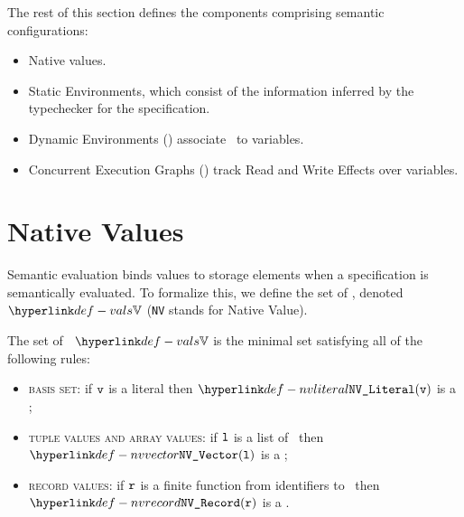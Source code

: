 The rest of this section defines the components comprising semantic configurations:
\begin{itemize}
    \item Native values.
    \item Static Environments, which consist of the information inferred
            by the typechecker for the specification.
    \item Dynamic Environments () associate \nativevalues\ to variables.
    \item Concurrent Execution Graphs () track Read and Write Effects over variables.
\end{itemize}

\hypertarget{def-vals}{}
\hypertarget{def-nativevalue}{}
\hypertarget{def-nativevalues}{}
\section{Native Values\label{sec:nativevalues}}
Semantic evaluation binds values to storage elements when a specification is semantically evaluated.
To formalize this, we define the set of \emph{\nativevalues}, denoted $\vals$
(\texttt{NV} stands for Native Value).

\ProseParagraph
The set of \nativevalues\ $\vals$ is the minimal set satisfying all of the following rules:
\begin{itemize}
  \item \textsc{basis set}: if $\texttt{v}$ is a literal then $\nvliteral{\vv}$ is a \nativevalue;
  \item \textsc{tuple values and array values}: if $\texttt{l}$ is a list of \nativevalues\ then $\nvvector{\vl}$ is a \nativevalue;
  \item \textsc{record values}: if $\texttt{r}$ is a finite function from identifiers to \nativevalues\ then $\nvrecord{\vr}$ is a \nativevalue.
\end{itemize}

\FormallyParagraph
\hypertarget{def-nvliteral}{}
\hypertarget{def-nvvector}{}
\hypertarget{def-nvrecord}{}

